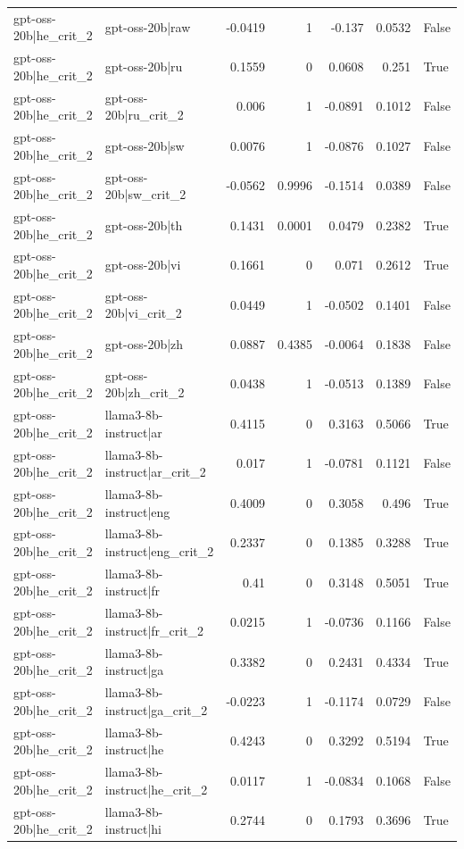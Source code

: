 \begin{table}
\begin{tabular}{l l r r r r l}
gpt-oss-20b|he_crit_2 & gpt-oss-20b|raw & -0.0419 & 1 & -0.137 & 0.0532 & False \\
gpt-oss-20b|he_crit_2 & gpt-oss-20b|ru & 0.1559 & 0 & 0.0608 & 0.251 & True \\
gpt-oss-20b|he_crit_2 & gpt-oss-20b|ru_crit_2 & 0.006 & 1 & -0.0891 & 0.1012 & False \\
gpt-oss-20b|he_crit_2 & gpt-oss-20b|sw & 0.0076 & 1 & -0.0876 & 0.1027 & False \\
gpt-oss-20b|he_crit_2 & gpt-oss-20b|sw_crit_2 & -0.0562 & 0.9996 & -0.1514 & 0.0389 & False \\
gpt-oss-20b|he_crit_2 & gpt-oss-20b|th & 0.1431 & 0.0001 & 0.0479 & 0.2382 & True \\
gpt-oss-20b|he_crit_2 & gpt-oss-20b|vi & 0.1661 & 0 & 0.071 & 0.2612 & True \\
gpt-oss-20b|he_crit_2 & gpt-oss-20b|vi_crit_2 & 0.0449 & 1 & -0.0502 & 0.1401 & False \\
gpt-oss-20b|he_crit_2 & gpt-oss-20b|zh & 0.0887 & 0.4385 & -0.0064 & 0.1838 & False \\
gpt-oss-20b|he_crit_2 & gpt-oss-20b|zh_crit_2 & 0.0438 & 1 & -0.0513 & 0.1389 & False \\
gpt-oss-20b|he_crit_2 & llama3-8b-instruct|ar & 0.4115 & 0 & 0.3163 & 0.5066 & True \\
gpt-oss-20b|he_crit_2 & llama3-8b-instruct|ar_crit_2 & 0.017 & 1 & -0.0781 & 0.1121 & False \\
gpt-oss-20b|he_crit_2 & llama3-8b-instruct|eng & 0.4009 & 0 & 0.3058 & 0.496 & True \\
gpt-oss-20b|he_crit_2 & llama3-8b-instruct|eng_crit_2 & 0.2337 & 0 & 0.1385 & 0.3288 & True \\
gpt-oss-20b|he_crit_2 & llama3-8b-instruct|fr & 0.41 & 0 & 0.3148 & 0.5051 & True \\
gpt-oss-20b|he_crit_2 & llama3-8b-instruct|fr_crit_2 & 0.0215 & 1 & -0.0736 & 0.1166 & False \\
gpt-oss-20b|he_crit_2 & llama3-8b-instruct|ga & 0.3382 & 0 & 0.2431 & 0.4334 & True \\
gpt-oss-20b|he_crit_2 & llama3-8b-instruct|ga_crit_2 & -0.0223 & 1 & -0.1174 & 0.0729 & False \\
gpt-oss-20b|he_crit_2 & llama3-8b-instruct|he & 0.4243 & 0 & 0.3292 & 0.5194 & True \\
gpt-oss-20b|he_crit_2 & llama3-8b-instruct|he_crit_2 & 0.0117 & 1 & -0.0834 & 0.1068 & False \\
gpt-oss-20b|he_crit_2 & llama3-8b-instruct|hi & 0.2744 & 0 & 0.1793 & 0.3696 & True \\

\end{tabular}
\end{table}
